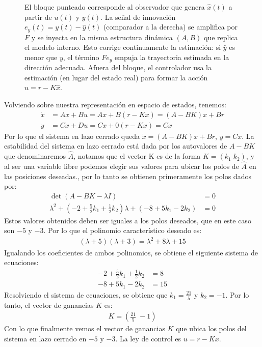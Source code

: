 \documentclass[
  11pt,
  letterpaper,
   addpoints,
   answers
  ]{exam}
\begin{document}
\begin{questions}
\begin{solution}
\begin{figure}[H]
    \caption{El bloque punteado corresponde al observador que genera $\hat x(t)$ a partir de $u(t)$ y $y(t)$. La señal de innovación $e_y(t)= y(t)-\hat y(t)$ (comparador a la derecha) se amplifica por $F$ y se inyecta en la misma estructura dinámica $(A, B)$ que replica el modelo interno. Esto corrige continuamente la estimación: si $\hat y$ es menor que $y$, el término $F e_y$ empuja la trayectoria estimada en la dirección adecuada. Afuera del bloque, el controlador usa la estimación (en lugar del estado real) para formar la acción $u = r - K\hat x$.}
  \end{figure}
  Volviendo sobre nuestra representación en espacio de estados, tenemos:
  \begin{align}
      \dot x &= Ax + Bu = Ax + B(r - Kx) = (A-BK)x + Br \\
      y &= Cx + Du = Cx + 0(r - Kx) = Cx
  \end{align}
  Por lo que el sistema en lazo cerrado queda $\dot x = (A-BK)x + Br$, $y = Cx$. La estabilidad del sistema en lazo cerrado está dada por los autovalores de $A-BK$ que denominaremos $\hat{A}$, notamos que el vector K es de la forma $K = (k_1 \; k_2)$, y al ser una variable libre podemos elegir sus valores para ubicar los polos de $\hat{A}$ en las posiciones deseadas., por lo tanto se obtienen primeramente los polos dados por:
  \begin{align}
    \det(A-BK -\lambda I) &= 0\\
    \lambda^{2} + \left(-2 + \frac{5}{2}k_1 + \frac{1}{2}k_2\right)\lambda + \left(-8 + 5k_1 - 2k_2\right) &= 0
  \end{align}
  Estos valores obtenidos deben ser iguales a los polos deseados, que en este caso son $-5$ y $-3$. Por lo que el polinomio característico deseado es:
  \begin{align}
    (\lambda + 5)(\lambda + 3) = \lambda^{2} + 8\lambda + 15
  \end{align}
  Igualando los coeficientes de ambos polinomios, se obtiene el siguiente sistema de ecuaciones:
  \begin{align}
    -2 + \frac{5}{2}k_1 + \frac{1}{2}k_2 &= 8 \\
    -8 + 5k_1 - 2k_2 &= 15
  \end{align}
  Resolviendo el sistema de ecuaciones, se obtiene que $k_1 = \frac{21}{5}$ y $k_2 = -1$. Por lo tanto, el vector de ganancias $K$ es:
  \begin{align}
    K = \left( \frac{21}{5} \; -1 \right)
  \end{align}
  Con lo que finalmente vemos el vector de ganancias $K$ que ubica los polos del sistema en lazo cerrado en $-5$ y $-3$. La ley de control es $u = r - Kx$.


\end{solution}
\end{questions}
\end{document}

